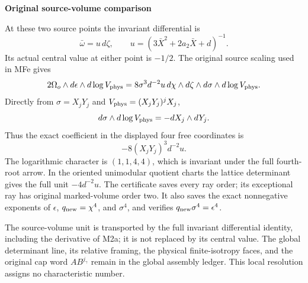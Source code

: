 \par

\medskip\noindent\textbf{Original source-volume comparison}

\par\nobreak

At these two source points the invariant differential is
\[
 \bar\omega=u\,d\zeta,\qquad
 u=(3\bar X^2+2a_2\bar X+d)^{-1}.
\]
Its actual central value at either point is \(-1/2\).
The original source scaling used in MFe gives
\[
 2\Omega_o\wedge d\epsilon\wedge d\log V_{\rm phys}
 =8\sigma^3d^{-2}u\,
       d\chi\wedge d\zeta\wedge d\sigma\wedge d\log V_{\rm phys}.
\]
Directly from \(\sigma=X_jY_j\) and
\(V_{\rm phys}=(X_jY_j)^jX_j\),
\[
 d\sigma\wedge d\log V_{\rm phys}=-dX_j\wedge dY_j.
\]
Thus the exact coefficient in the displayed four free coordinates is
\[
 -8(X_jY_j)^3d^{-2}u .
\]
The logarithmic character is \((1,1,4,4)\), which is invariant under
the full fourth-root arrow. In the oriented unimodular quotient
charts the lattice determinant gives the full unit
\(-4d^{-2}u\). The certificate saves every ray order; its exceptional
ray has original marked-volume order two. It also saves the exact
nonnegative exponents of \(\epsilon\), \(q_{\rm new}=\chi^4\),
and \(\sigma^4\), and verifies
\(q_{\rm new}\sigma^4=\epsilon^4\).

The source-volume unit is transported by the full invariant
differential identity, including the derivative of M2a; it is not
replaced by its central value. The global determinant line, its
relative framing, the physical finite-isotropy faces, and the
original cap word \(AB^{j_\gamma}\) remain in the global assembly
ledger. This local resolution assigns no characteristic number.

